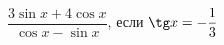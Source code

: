 \begin{ex}[type=simplify_calculate]
	\begin{condition}
		\( \dfrac{3\sin x+4\cos x}{\cos x-\sin x} \), \quad если \( \tg x=-\dfrac{1}{3} \)
	\end{condition}
\end{ex}
